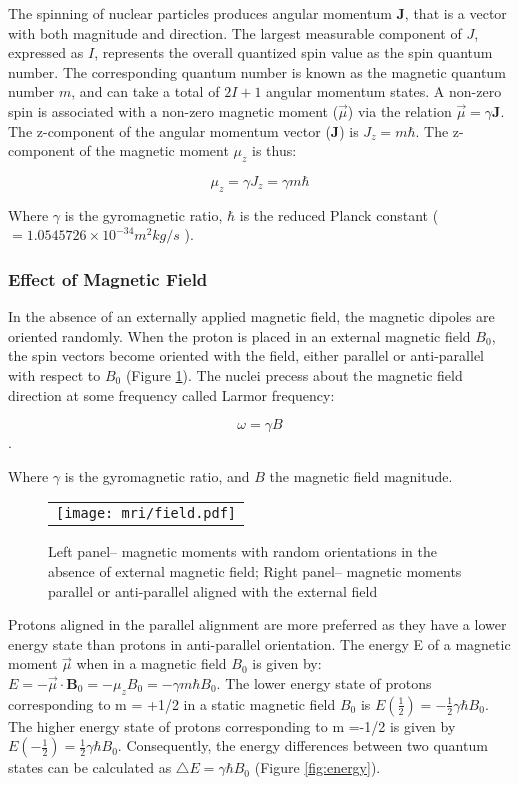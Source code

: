 The spinning of nuclear particles produces angular momentum  $\textbf{J}$, that is a vector with both magnitude and direction. The largest measurable component of $J$, expressed as $I$, represents the overall quantized spin value as the spin quantum number. The corresponding quantum number is known as the magnetic quantum number $m$, and can take a total of $2I + 1$ angular momentum states.  A non-zero spin is associated with a non-zero magnetic moment ($\vec{\mu}$) via the relation $\vec{\mu} =\gamma \textbf{J}$. The z-component of the angular momentum vector (\textbf{J}) is $J_z = m \hbar$. The z-component of the magnetic moment $\mu_z$ is thus: 

$$\mu_z=\gamma J_z=\gamma m \hbar$$

Where $\gamma$ is the gyromagnetic ratio, $\hbar$ is the reduced Planck constant ($=1.0545726 \times 10^{-34} m^2kg/s$ ).

\subsubsection{Effect of Magnetic Field}

In the absence of an externally applied magnetic field, the magnetic dipoles are oriented randomly. When the proton is placed in an external magnetic field $B_0$, the spin vectors become oriented with the field, either parallel or anti-parallel with respect to $B_0$ (Figure \ref{fig:externalB0}). The nuclei precess about the magnetic field direction at some frequency called Larmor frequency: 

$$\omega = \gamma B$$.

Where $\gamma$ is the gyromagnetic ratio, and $B$ the magnetic field magnitude.


\begin{figure}[htb]
\begin{center}
\begin{tabular}{c}
\texttt{[image: mri/field.pdf]}
\end{tabular}
\caption{Left panel-- magnetic moments with random orientations in the absence of external magnetic field; Right panel-- magnetic moments parallel or anti-parallel aligned with the external
field} \label{fig:externalB0}
\end{center}
\end{figure}

Protons aligned in the parallel alignment are more preferred as they have a lower energy state than protons in anti-parallel orientation. The energy E of a magnetic moment $\vec{\mu}$ when in a magnetic field $B_0$ is given by: $E=-\vec{\mu}\cdot \textbf{B}_0=-\mu_z B_0=-\gamma m \hbar B_0$. The lower energy state of protons corresponding to m = +1/2 in a static magnetic field $B_0$ is $E(\frac{1}{2})=-\frac{1}{2}\gamma \hbar B_0$. The higher energy state of protons corresponding to m =-1/2 is given by $E(-\frac{1}{2})=\frac{1}{2}\gamma \hbar B_0$.
Consequently, the energy differences between two quantum states can be calculated as $\bigtriangleup E = \gamma \hbar B_0$ (Figure \ref{fig:energy}).

